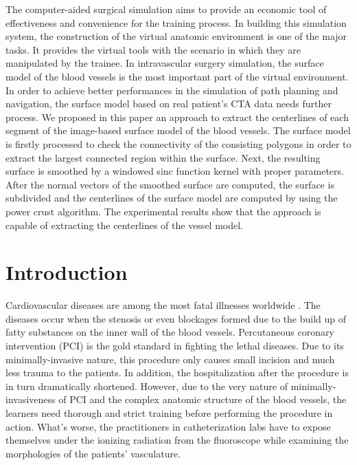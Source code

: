 
The computer-aided surgical simulation aims to provide an economic tool of effectiveness and convenience for the training process.
In building this simulation system, the construction of the virtual anatomic environment is one of the major tasks.
It provides the virtual tools with the scenario in which they are manipulated by the trainee.
In intravascular surgery simulation, the surface model of the blood vessels is the most important part of the virtual environment.
In order to achieve better performances in the simulation of path planning and navigation, the surface model based on real patient's CTA data needs further process.
We proposed in this paper an approach to extract the centerlines of each segment of the image-based surface model of the blood vessels.
The surface model is firstly processed to check the connectivity of the consisting polygons in order to extract the largest connected region within the surface.
Next, the resulting surface is smoothed by a windowed sinc function kernel with proper parameters.
After the normal vectors of the smoothed surface are computed, the surface is subdivided and the centerlines of the surface model are computed by using the power crust algorithm. %
The experimental results show that the approach is capable of extracting the centerlines of the vessel model.

\section{Introduction}
\label{sec5_0}
Cardiovascular diseases are among the most fatal illnesses worldwide \cite{WHO2013}.
The diseases occur when the stenosis or even blockages formed due to the build up of fatty substances on the inner wall of the blood vessels.
Percutaneous coronary intervention (PCI) is the gold standard in fighting the lethal diseases.
Due to its minimally-invasive nature, this procedure only causes small incision and much less trauma to the patients.
In addition, the hospitalization after the procedure is in turn dramatically shortened.
However, due to the very nature of minimally-invasiveness of PCI and the complex anatomic structure of the blood vessels, the learners need thorough and strict training before performing the procedure in action. %
What's worse, the practitioners in catheterization labs have to expose themselves under the ionizing radiation from the fluoroscope while examining the morphologies of the patients' vasculature. %

